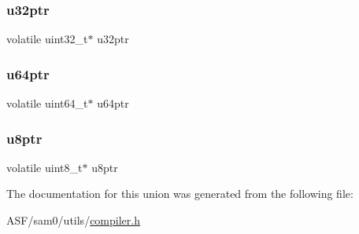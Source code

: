 \subsubsection{\texorpdfstring{u32ptr}{u32ptr}}
{\footnotesize\ttfamily volatile uint32\+\_\+t$\ast$ u32ptr}

\mbox{\label{union_union_v_ptr_a1acc0e7be6320444fc9a35fbd89f1f37}} 
\subsubsection{\texorpdfstring{u64ptr}{u64ptr}}
{\footnotesize\ttfamily volatile uint64\+\_\+t$\ast$ u64ptr}

\mbox{\label{union_union_v_ptr_a4213589251839cd1f42c3343c6cb9be9}} 
\subsubsection{\texorpdfstring{u8ptr}{u8ptr}}
{\footnotesize\ttfamily volatile uint8\+\_\+t$\ast$ u8ptr}



The documentation for this union was generated from the following file\+:\begin{DoxyCompactItemize}
\item 
A\+S\+F/sam0/utils/\mbox{\hyperlink{compiler_8h}{compiler.\+h}}\end{DoxyCompactItemize}
